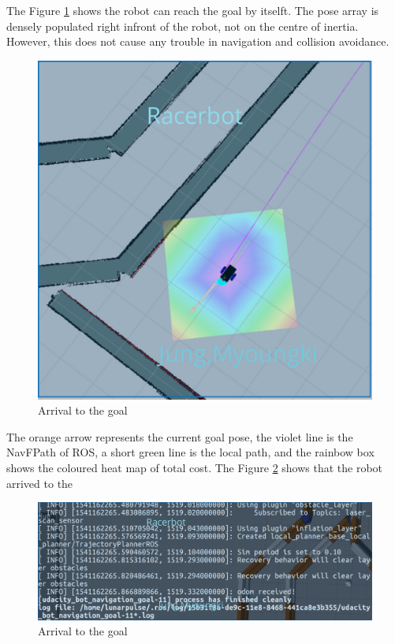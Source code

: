 \documentclass[10pt,journal,compsoc]{IEEEtran}
\begin{document}
The Figure \ref{fig:goal_arrival} shows the robot can reach the goal by itselft. The pose array is densely populated right infront of the robot, not on the centre of inertia. However, this does not cause any trouble in navigation and collision avoidance.
\begin{figure}[thpb]
      \centering
      \includegraphics[width=\linewidth]{./img/goalarrival.png}
      \caption{Arrival to the goal}
      \label{fig:goal_arrival}
\end{figure}
The orange arrow represents the current goal pose, the violet line is the NavFPath of ROS, a short green line is the local path, and the rainbow box shows the coloured heat map of total cost. 
The Figure  \ref{fig:goalconsole} shows that the robot arrived to the 
\begin{figure}[thpb]
      \centering
      \includegraphics[width=\linewidth]{./img/goalconsole.png}
      \caption{Arrival to the goal}
      \label{fig:goalconsole}
\end{figure}
\end{document}
